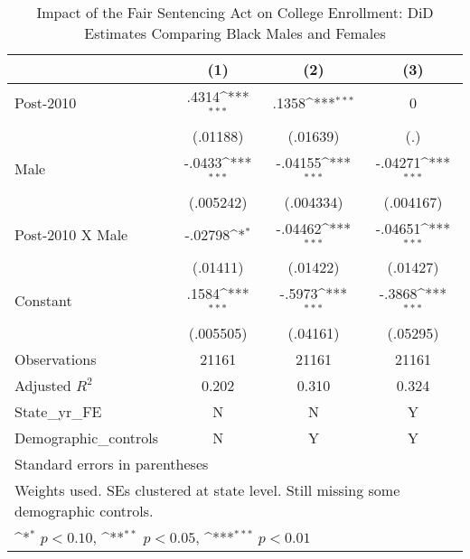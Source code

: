 \begin{table}[htbp]\centering
\def\sym#1{\ifmmode^{#1}\else\(^{#1}\)\fi}
\caption{Impact of the Fair Sentencing Act on College Enrollment: DiD Estimates Comparing Black Males and Females}
\begin{tabular}{l*{3}{c}}
\hline\hline
                    &\multicolumn{1}{c}{(1)}         &\multicolumn{1}{c}{(2)}         &\multicolumn{1}{c}{(3)}         \\
\hline
Post-2010           &       .4314\sym{***}&       .1358\sym{***}&           0         \\
                    &    (.01188)         &    (.01639)         &         (.)         \\
[1em]
Male                &      -.0433\sym{***}&     -.04155\sym{***}&     -.04271\sym{***}\\
                    &   (.005242)         &   (.004334)         &   (.004167)         \\
[1em]
Post-2010 X Male    &     -.02798\sym{*}  &     -.04462\sym{***}&     -.04651\sym{***}\\
                    &    (.01411)         &    (.01422)         &    (.01427)         \\
[1em]
Constant            &       .1584\sym{***}&      -.5973\sym{***}&      -.3868\sym{***}\\
                    &   (.005505)         &    (.04161)         &    (.05295)         \\
\hline
Observations        &       21161         &       21161         &       21161         \\
Adjusted \(R^{2}\)  &       0.202         &       0.310         &       0.324         \\
State\_yr\_FE         &           N         &           N         &           Y         \\
Demographic\_controls&           N         &           Y         &           Y         \\
\hline\hline
\multicolumn{4}{l}{\footnotesize Standard errors in parentheses}\\
\multicolumn{4}{l}{\footnotesize Weights used. SEs clustered at state level. Still missing some demographic controls.}\\
\multicolumn{4}{l}{\footnotesize \sym{*} \(p<0.10\), \sym{**} \(p<0.05\), \sym{***} \(p<0.01\)}\\
\end{tabular}
\end{table}
